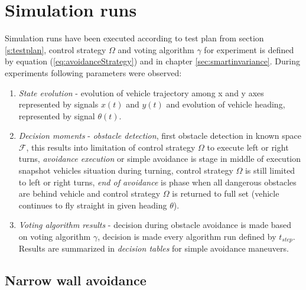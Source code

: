 \section{Simulation runs}\label{s:simulationruns}
Simulation runs have been executed according to test plan from section \ref{s:testplan}, control strategy $\Omega$ and voting algorithm $\gamma$ for experiment is defined by equation (\ref{eq:avoidanceStrategy}) and in chapter \ref{sec:smartinvariance}. During experiments following parameters were observed:
\begin{enumerate}
    \item \textit{State evolution} - evolution of vehicle trajectory among x and y axes represented by signals $x(t)$ and $y(t)$ and evolution of vehicle heading, represented by signal $\theta (t)$.
    \item \textit{Decision moments} - \textit{obstacle detection}, first obstacle detection in known space $\mathscr{F}$, this results into limitation of control strategy $\Omega$ to execute left or right turns, \textit{avoidance execution} or simple avoidance is stage in middle of execution snapshot vehicles situation during turning, control strategy $\Omega$ is still limited to left or right turns, \textit{end of avoidance} is phase when all dangerous obstacles are behind vehicle and control strategy $\Omega$ is returned to full set (vehicle continues to fly straight in given heading $\theta$).
    \item \textit{Voting algorithm results} - decision during obstacle avoidance is made based on voting algorithm $\gamma$, decision is made every algorithm run defined by $t_{step}$. Results are summarized in \textit{decision tables} for simple avoidance maneuvers.
\end{enumerate}

\subsection{Narrow wall avoidance}

